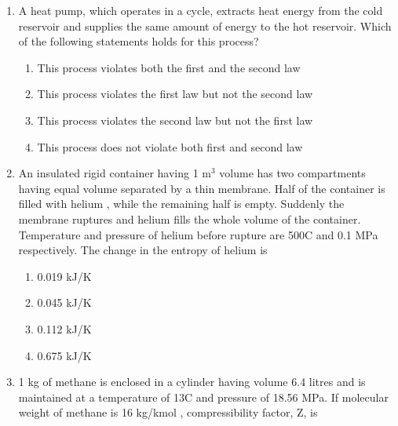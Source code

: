 \documentclass[a4paper,10pt]{article}
\begin{document}
\begin{enumerate}
\begin{multicols}{4}
\begin{enumerate}
\item 0.287
\item 0.431
\item 0.718
\item 1.005
\end{enumerate}
\end{multicols}

\item A heat pump, which operates in a cycle, extracts heat energy from the cold reservoir and supplies the same amount of energy to the hot reservoir. Which of the following statements holds for this process?
\hfill{}

\begin{enumerate}
\item This process violates both the first and the second law
\item This process violates the first law but not the second law
\item This process violates the second law but not the first law
\item This process does not violate both first and second law
\end{enumerate}

\item An insulated rigid container having 1 m$^3$ volume has two compartments having equal volume separated by a thin membrane. Half of the container is filled with helium , while the remaining half is empty. Suddenly the membrane ruptures and helium fills the whole volume of the container. Temperature and pressure of helium before rupture are 500\degree C and 0.1 MPa respectively. The change in the entropy of helium is
\hfill{}

\begin{multicols}{4}
\begin{enumerate}
\item 0.019 kJ/K
\item 0.045 kJ/K
\item 0.112 kJ/K
\item 0.675 kJ/K
\end{enumerate}
\end{multicols}

\item 1 kg of methane is enclosed in a cylinder having volume 6.4 litres and is maintained at a temperature of 13\degree C and pressure of 18.56 MPa. If molecular weight of methane is 16 kg/kmol , compressibility factor, Z, is
\begin{flushright}
\end{flushright}


\end{enumerate}
\end{document}
